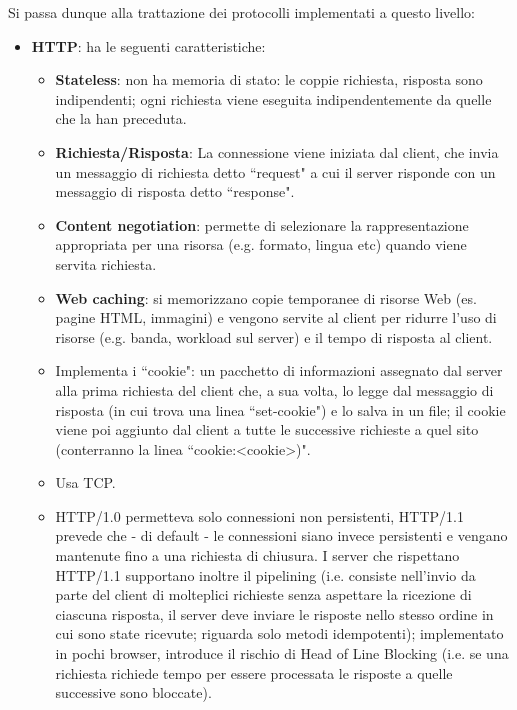 \documentclass[11pt, italian, openany]{book}
\begin{document}
\begin{sloppypar}
Si passa dunque alla trattazione dei protocolli implementati a questo livello:
\begin{itemize}[topsep=0pt]
	\itemsep-0.3em
	\item \textbf{HTTP}: ha le seguenti caratteristiche:
	\vspace{-3.5mm}
	\begin{itemize}
		\itemsep-0.3em
		\item \textbf{Stateless}: non ha memoria di stato: le coppie richiesta, risposta sono indipendenti; ogni richiesta viene eseguita indipendentemente
		da quelle che la han preceduta.
		\item \textbf{Richiesta/Risposta}: La connessione viene iniziata dal client, che invia un messaggio di richiesta detto ``request" a cui il server
		risponde con un messaggio di risposta detto ``response".
		\item \textbf{Content negotiation}: permette di selezionare la rappresentazione appropriata per una risorsa (e.g. formato, lingua etc) quando
		viene servita richiesta.
		\item \textbf{Web caching}: si memorizzano copie temporanee di risorse Web (es. pagine HTML, immagini) e vengono servite al client per ridurre
		l’uso di risorse (e.g. banda, workload sul server) e il tempo di risposta al client.
		\item Implementa i ``cookie": un pacchetto di informazioni assegnato dal server alla prima richiesta del client che, a sua volta, lo legge dal
		messaggio di risposta (in cui trova una linea ``set-cookie") e lo salva in un file; il cookie viene poi aggiunto dal client a tutte le successive
		richieste a quel sito (conterranno la linea ``cookie:\textless{cookie}\textgreater{)}".
		\item Usa TCP.
		\item HTTP/1.0 permetteva solo connessioni non persistenti, HTTP/1.1 prevede che - di default - le connessioni siano invece persistenti e vengano
		mantenute fino a una richiesta di chiusura. I server che rispettano HTTP/1.1 supportano inoltre il pipelining (i.e. consiste nell’invio da parte del
		client di molteplici richieste senza aspettare la ricezione di ciascuna risposta, il server deve inviare le risposte nello stesso ordine in cui
		sono state ricevute; riguarda solo metodi idempotenti); implementato in pochi browser, introduce il rischio di Head of Line Blocking (i.e. se una
		richiesta richiede tempo per essere processata le risposte a quelle successive sono bloccate).
	\end{itemize}


\end{itemize}
\end{sloppypar}
\end{document}
